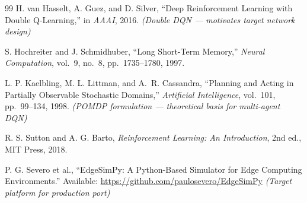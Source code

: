 \documentclass[12pt,a4paper]{report}
\begin{document}
\begin{thebibliography}{99}
H. van Hasselt, A. Guez, and D. Silver,
``Deep Reinforcement Learning with Double Q-Learning,''
in \textit{AAAI}, 2016. \emph{(Double DQN --- motivates target network design)}

S. Hochreiter and J. Schmidhuber,
``Long Short-Term Memory,''
\textit{Neural Computation}, vol.\ 9, no.\ 8, pp.\ 1735--1780, 1997.

L. P. Kaelbling, M. L. Littman, and A.\ R. Cassandra,
``Planning and Acting in Partially Observable Stochastic Domains,''
\textit{Artificial Intelligence}, vol.\ 101, pp.\ 99--134, 1998.
\emph{(POMDP formulation --- theoretical basis for multi-agent DQN)}

R. S. Sutton and A. G. Barto,
\textit{Reinforcement Learning: An Introduction}, 2nd ed.,
MIT Press, 2018.

P. G. Severo et al.,
``EdgeSimPy: A Python-Based Simulator for Edge Computing Environments.''
Available: \url{https://github.com/paulosevero/EdgeSimPy}
\emph{(Target platform for production port)}

\end{thebibliography}
\end{document}
